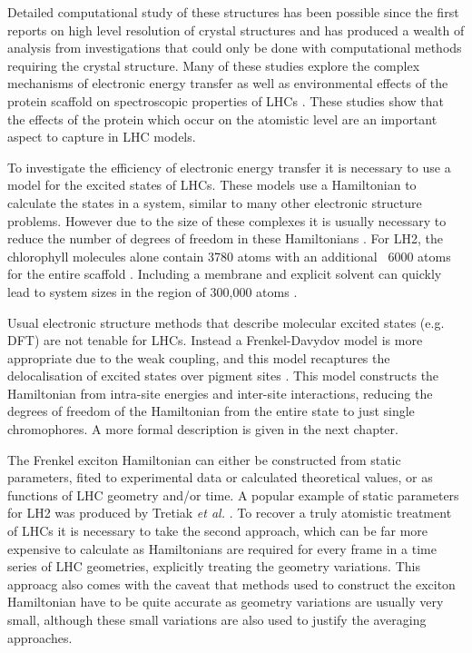 Detailed computational study of these structures has been possible since the first
reports on high level resolution of crystal structures \cite{Mcdermott1995, Koepke1996} 
and has produced a wealth of analysis from investigations that could only be done 
with computational methods requiring the crystal structure. Many of these studies 
explore the complex mechanisms of electronic energy transfer as well as environmental 
effects of the protein scaffold on spectroscopic properties of LHCs \cite{SlaMa2020, Jang2015, Curutchet2016, Mirkovic2016}. 
These studies show that the effects of the protein which occur on the atomistic
level are an important aspect to capture in LHC models.

To investigate the efficiency of electronic energy transfer it is necessary to use 
a model for the excited states of LHCs. These models use a Hamiltonian to calculate
the states in a system, similar to many other electronic structure problems. However 
due to the size of these complexes it is usually necessary to reduce the number of 
degrees of freedom in these Hamiltonians \cite{Mallus2018, SlaMa2020}. For LH2, 
the chlorophyll molecules alone contain 3780 atoms with an additional ~6000 atoms 
for the entire scaffold \cite{Neugebauer2008, Cherezov2006}. Including a membrane 
and explicit solvent can quickly lead to system sizes in the region of 300,000 atoms \cite{Mennucci2019}.

Usual electronic structure methods that describe molecular excited states (e.g. 
DFT) are not tenable for LHCs. Instead a Frenkel-Davydov model is more appropriate
due to the weak coupling, and this model recaptures the delocalisation of excited
states over pigment sites \cite{Frenkel1931, Davydov1964}. This model constructs
the Hamiltonian from intra-site energies and inter-site interactions, reducing the
degrees of freedom of the Hamiltonian from the entire state to just single chromophores.
A more formal description is given in the next chapter.

The Frenkel exciton Hamiltonian can either be constructed from static parameters,
fited to experimental data or calculated theoretical values, or as functions of LHC 
geometry and/or time. A popular example of static parameters for LH2 was produced
by Tretiak \emph{et al.} \cite{Tretiak2000}. To recover a truly atomistic treatment
of LHCs it is necessary to take the second approach, which can be far more expensive 
to calculate as Hamiltonians are required for every frame in a time series of LHC 
geometries, explicitly treating the geometry variations. This approacg also comes 
with the caveat that methods used to construct the exciton Hamiltonian have to be
quite accurate as geometry variations are usually very small, although these small
variations are also used to justify the averaging approaches.

